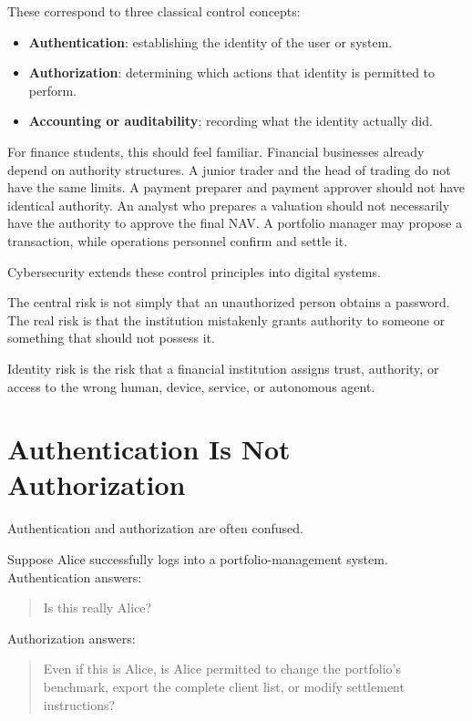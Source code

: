 These correspond to three classical control concepts:

\begin{itemize}
    \item \textbf{Authentication}: establishing the identity of the user or system.
    \item \textbf{Authorization}: determining which actions that identity is permitted to perform.
    \item \textbf{Accounting or auditability}: recording what the identity actually did.
\end{itemize}

For finance students, this should feel familiar. Financial businesses already depend on authority structures. A junior trader and the head of trading do not have the same limits. A payment preparer and payment approver should not have identical authority. An analyst who prepares a valuation should not necessarily have the authority to approve the final NAV. A portfolio manager may propose a transaction, while operations personnel confirm and settle it.

Cybersecurity extends these control principles into digital systems.

The central risk is not simply that an unauthorized person obtains a password. The real risk is that the institution mistakenly grants authority to someone or something that should not possess it.

\begin{intuition}
Identity risk is the risk that a financial institution assigns trust, authority, or access to the wrong human, device, service, or autonomous agent.
\end{intuition}

\section{Authentication Is Not Authorization}

Authentication and authorization are often confused.

Suppose Alice successfully logs into a portfolio-management system. Authentication answers:

\begin{quote}
Is this really Alice?
\end{quote}

Authorization answers:

\begin{quote}
Even if this is Alice, is Alice permitted to change the portfolio's benchmark, export the complete client list, or modify settlement instructions?
\end{quote}

